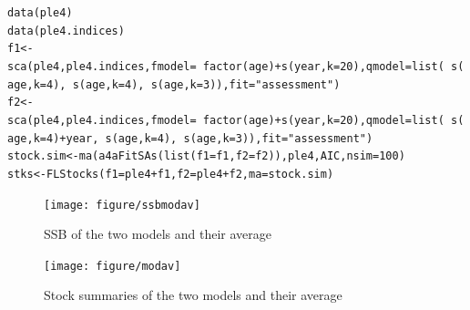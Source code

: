 \documentclass[a4paper,english,10pt]{article}\usepackage[]{graphicx}\usepackage[]{color}
\makeatletter
\newcommand{\hlnum}[1]{\textcolor[rgb]{0.2,0.2,0.2}{#1}}%
\newcommand{\hlstr}[1]{\textcolor[rgb]{0.2,0.2,0.2}{#1}}%
\newcommand{\hlopt}[1]{\textcolor[rgb]{0.2,0.2,0.2}{#1}}%
\newcommand{\hlstd}[1]{\textcolor[rgb]{0,0,0}{#1}}%
\newcommand{\hlkwb}[1]{\textcolor[rgb]{0.361,0.506,0.596}{#1}}%
\newcommand{\hlkwc}[1]{\textcolor[rgb]{0.361,0.506,0.596}{#1}}%
\newcommand{\hlkwd}[1]{\textcolor[rgb]{0.361,0.506,0.596}{#1}}%
\newenvironment{kframe}{%
 \def\at@end@of@kframe{}%
 \ifinner\ifhmode%
  \def\at@end@of@kframe{\end{minipage}}%
  \begin{minipage}{\columnwidth}%
 \fi\fi%
 \def\FrameCommand##1{\hskip\@totalleftmargin \hskip-\fboxsep
 \colorbox{shadecolor}{##1}\hskip-\fboxsep
     \hskip-\linewidth \hskip-\@totalleftmargin \hskip\columnwidth}%
 \MakeFramed {\advance\hsize-\width
   \@totalleftmargin\z@ \linewidth\hsize
   \@setminipage}}%
 {\par\unskip\endMakeFramed%
 \at@end@of@kframe}
\newenvironment{knitrout}{}{} %
\makeatother
\begin{document}
\begin{knitrout}
\color{fgcolor}\begin{kframe}
\begin{alltt}
\hlkwd{data}\hlstd{(ple4)}
\hlkwd{data}\hlstd{(ple4.indices)}
\hlstd{f1} \hlkwb{<-} \hlkwd{sca}\hlstd{(ple4, ple4.indices,} \hlkwc{fmodel}\hlstd{=}\hlopt{~} \hlkwd{factor}\hlstd{(age)} \hlopt{+} \hlkwd{s}\hlstd{(year,} \hlkwc{k}\hlstd{=}\hlnum{20}\hlstd{),} \hlkwc{qmodel}\hlstd{=}\hlkwd{list}\hlstd{(}\hlopt{~} \hlkwd{s}\hlstd{(age,} \hlkwc{k} \hlstd{=} \hlnum{4}\hlstd{),} \hlopt{~} \hlkwd{s}\hlstd{(age,} \hlkwc{k} \hlstd{=} \hlnum{4}\hlstd{),} \hlopt{~} \hlkwd{s}\hlstd{(age,} \hlkwc{k} \hlstd{=} \hlnum{3}\hlstd{)),} \hlkwc{fit} \hlstd{=} \hlstr{"assessment"}\hlstd{)}
\hlstd{f2} \hlkwb{<-} \hlkwd{sca}\hlstd{(ple4, ple4.indices,} \hlkwc{fmodel}\hlstd{=}\hlopt{~} \hlkwd{factor}\hlstd{(age)} \hlopt{+} \hlkwd{s}\hlstd{(year,} \hlkwc{k}\hlstd{=}\hlnum{20}\hlstd{),} \hlkwc{qmodel}\hlstd{=}\hlkwd{list}\hlstd{(}\hlopt{~} \hlkwd{s}\hlstd{(age,} \hlkwc{k} \hlstd{=} \hlnum{4}\hlstd{)}\hlopt{+}\hlstd{year,} \hlopt{~} \hlkwd{s}\hlstd{(age,} \hlkwc{k} \hlstd{=} \hlnum{4}\hlstd{),} \hlopt{~} \hlkwd{s}\hlstd{(age,} \hlkwc{k} \hlstd{=} \hlnum{3}\hlstd{)),} \hlkwc{fit} \hlstd{=} \hlstr{"assessment"}\hlstd{)}
\hlstd{stock.sim} \hlkwb{<-} \hlkwd{ma}\hlstd{(}\hlkwd{a4aFitSAs}\hlstd{(}\hlkwd{list}\hlstd{(}\hlkwc{f1}\hlstd{=f1,} \hlkwc{f2}\hlstd{=f2)), ple4, AIC,} \hlkwc{nsim} \hlstd{=} \hlnum{100}\hlstd{)}
\hlstd{stks} \hlkwb{<-} \hlkwd{FLStocks}\hlstd{(}\hlkwc{f1}\hlstd{=ple4}\hlopt{+}\hlstd{f1,} \hlkwc{f2}\hlstd{=ple4}\hlopt{+}\hlstd{f2,} \hlkwc{ma}\hlstd{=stock.sim)}
\end{alltt}
\end{kframe}
\end{knitrout}

\begin{knitrout}
\color{fgcolor}\begin{figure}[H]


{\centering \texttt{[image: figure/ssbmodav]} 

}

\caption[SSB of the two models and their average]{SSB of the two models and their average\label{fig:ssbmodav}}
\end{figure}


\end{knitrout}

\begin{knitrout}
\color{fgcolor}\begin{figure}[H]


{\centering \texttt{[image: figure/modav]} 

}

\caption[Stock summaries of the two models and their average]{Stock summaries of the two models and their average\label{fig:modav}}
\end{figure}


\end{knitrout}
\end{document}
